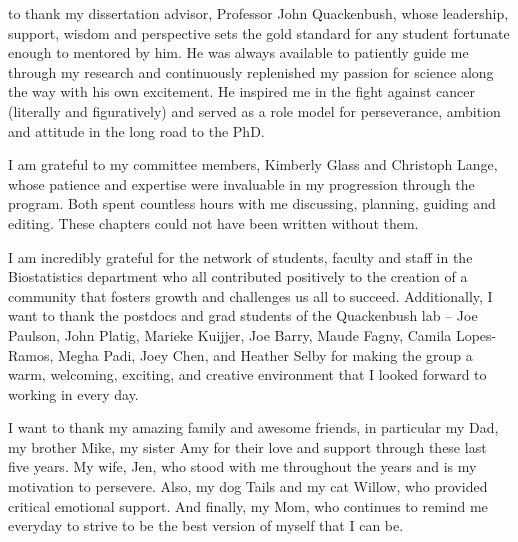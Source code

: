 
 to thank my dissertation advisor, Professor John Quackenbush, whose leadership, support, wisdom and perspective sets the gold standard for any student fortunate enough to mentored by him. He was always available to patiently guide me through my research and continuously replenished my passion for science along the way with his own excitement.  He inspired me in the fight against cancer (literally and figuratively) and served as a role model for perseverance, ambition and attitude in the long road to the PhD.  

I am grateful to my committee members, Kimberly Glass and Christoph Lange, whose patience and expertise were invaluable in my progression through the program.  Both spent countless hours with me discussing, planning, guiding and editing. These chapters could not have been written without them.

I am incredibly grateful for the network of students, faculty and staff in the Biostatistics department who all contributed positively to the creation of a community that fosters growth and challenges us all to succeed. Additionally, I want to thank the postdocs and grad students of the Quackenbush lab – Joe Paulson, John Platig, Marieke Kuijjer, Joe Barry, Maude Fagny, Camila Lopes-Ramos, Megha Padi, Joey Chen, and Heather Selby for making the group a warm, welcoming, exciting, and creative environment that I looked forward to working in every day.

I want to thank my amazing family and awesome friends, in particular my Dad, my brother Mike, my sister Amy for their love and support through these last five years.  My wife, Jen, who stood with me throughout the years and is my motivation to persevere. Also, my dog Tails and my cat Willow, who provided critical emotional support.  And finally, my Mom, who continues to remind me everyday to strive to be the best version of myself that I can be.
